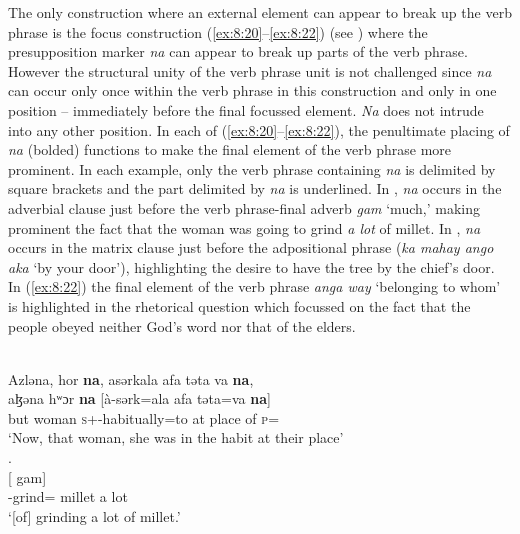 The only construction where an external element can appear to break up the verb phrase is the focus construction (\ref{ex:8:20}--\ref{ex:8:22}) (see ) where the presupposition marker \textit{na} can appear to break up parts of the verb phrase. However the structural unity of the verb phrase unit is not challenged since \textit{na} can occur only once within the verb phrase in this construction and only in one position -- immediately before the final focussed element. \textit{Na} does not intrude into any other position. In each of (\ref{ex:8:20}--\ref{ex:8:22}), the penultimate placing of \textit{na} (bolded) functions to make the final element of the verb phrase more prominent. In each example, only the verb phrase containing \textit{na }is delimited by square brackets and the part delimited by\textit{ na}  is underlined. In ,\textit{ na }occurs in the adverbial clause just before the verb phrase-final adverb \textit{gam} ‘much,’ making prominent the fact that the woman was going to grind \textit{a lot} of millet.  In , \textit{na} occurs in the matrix clause just before the adpositional phrase (\textit{ka  mahay  ango  aka} ‘by your door’), highlighting the desire to have the tree by the chief's door. In (\ref{ex:8:22}) the final element of the verb phrase \textit{anga way} ‘belonging to whom' is highlighted in the rhetorical question which focussed on the fact that the people obeyed neither God's word nor that of the elders.  


\ea \label{ex:8:20}\\
Azləna,  hor  \textbf{na},  asərkala  afa  təta  va  \textbf{na},\\  
\gll  aɮəna  hʷɔr  \textbf{na}  [à-sərk=ala   afa            təta=va  \textbf{na}]\\
      but  woman  {\PSP}    \textsc{s}+{\PFV}-habitually=to    {at place of}  \textsc{p}={\PRF}  {\PSP}\\
\glt  ‘Now, that woman, she was in the habit at their place’\\
.\\
\gll  {}[   {gam}]\\
      \db {\DEP}-grind={\PLU}   millet  {\PSP}   {a lot}\\
\glt  ‘[of] grinding a lot of millet.’
\z

